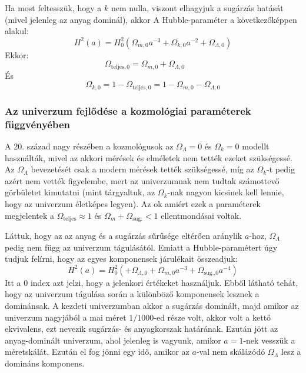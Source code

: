 \documentclass[../main.tex]{subfiles}
\begin{document}
Ha most feltesszük, hogy a $k$ nem nulla, viszont elhagyjuk a sugárzás hatását (mivel jelenleg az anyag dominál), akkor A Hubble-paraméter a következőképpen alakul:
\begin{equation}
    H^2(a) = H^2_0 \left( \Omega_{m,0} a^{-3} + \Omega_{k,0} a^{-2} + \Omega_{\Lambda,0} \right)
\end{equation}
Ekkor:
\begin{equation}
    \Omega_{\text{teljes}, 0} = \Omega_{m,0} + \Omega_{\Lambda,0} \qquad
\end{equation}
És
\begin{equation}
    \Omega_{k,0} = 1 - \Omega_{\text{teljes}, 0} = 1 - \Omega_{m,0} - \Omega_{\Lambda,0}
\end{equation}\subsubsection{Az univerzum fejlődése a kozmológiai paraméterek függvényében}
A 20. század nagy részében a kozmológusok az $\Omega_\Lambda = 0$ és $\Omega_k = 0$ modellt használták, mivel az akkori mérések és elméletek nem tették ezeket szükségessé. Az $\Omega_\Lambda$ bevezetését csak a modern
mérések tették szükségessé, míg az $\Omega_k$-t pedig azért nem vették figyelembe, mert az univerzumnak nem tudtak számottevő görbületet kimutatni (mint tárgyaltuk, az $\Omega_k$-nak nagyon kicsinek kell lennie, hogy az univerzum életképes legyen).
Az ok amiért ezek a paraméterek megjelentek a $\Omega_\text{teljes} \approx 1$ és $\Omega_m + \Omega_\text{sug.} < 1$ ellentmondásai voltak.

Láttuk, hogy az az anyag és a sugárzás sűrűsége eltérően aránylik $a$-hoz, $\Omega_\Lambda$ pedig nem függ az univerzum tágulásától. Emiatt a Hubble-paramétert úgy tudjuk felírni, hogy az egyes komponensek járulékait összeadjuk:
\begin{equation}
    H^2(a) = H^2_0 \left(+ \Omega_{\Lambda,0} + \Omega_{m,0} a^{-3} + \Omega_{\text{sug.,0}} a^{-4}\right)
\end{equation}
Itt a 0 index azt jelzi, hogy a jelenkori értékeket használjuk. Ebből látható tehát, hogy az univerzum tágulása során a különböző komponensek lesznek a dominánsak.
A kezdeti univerzumban akkor a sugárzás dominált, majd amikor az univerzum nagyjából a mai méret $1/1000$-ed része volt, akkor volt a kettő ekvivalens, ezt nevezik sugárzás- és anyagkorszak határának.
Ezután jött az anyag-dominált univerzum, ahol jelenleg is vagyunk, amikor $a = 1$-nek vesszük a méretskálát. Ezután el fog jönni egy idő, amikor az $a$-val nem skálázódó $\Omega_\Lambda$ lesz a domináns komponens.
\end{document}
